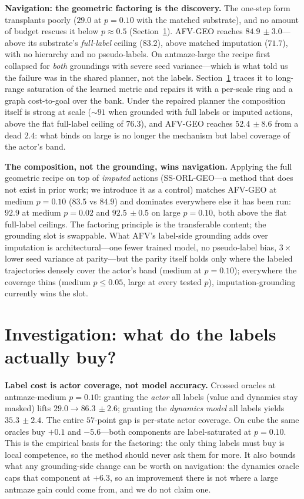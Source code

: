 \documentclass{article}
\newcommand{\pmm}[2]{#1{\scriptstyle\,\pm #2}}
\theoremstyle{plain}
\theoremstyle{definition}
\begin{document}
\textbf{Navigation: the geometric factoring is the discovery.} The one-step form transplants poorly ($29.0$ at $p{=}0.10$ with the matched substrate), and no amount of budget rescues it below $p{\approx}0.5$ (Section~\ref{sec:invest}). AFV-GEO reaches $\pmm{84.9}{3.0}$---above its substrate's \emph{full-label} ceiling ($83.2$), above matched imputation ($71.7$), with no hierarchy and no pseudo-labels. On antmaze-large the recipe first collapsed for \emph{both} groundings with severe seed variance---which is what told us the failure was in the shared planner, not the labels. Section~\ref{sec:invest} traces it to long-range saturation of the learned metric and repairs it with a per-scale ring and a graph cost-to-goal over the bank. Under the repaired planner the composition itself is strong at scale (${\sim}91$ when grounded with full labels or imputed actions, above the flat full-label ceiling of $76.3$), and AFV-GEO reaches $\pmm{52.4}{8.6}$ from a dead $2.4$: what binds on large is no longer the mechanism but label coverage of the actor's band.

\textbf{The composition, not the grounding, wins navigation.} Applying the full geometric recipe on top of \emph{imputed} actions (SS-ORL-GEO---a method that does not exist in prior work; we introduce it as a control) matches AFV-GEO at medium $p{=}0.10$ ($83.5$ vs $84.9$) and dominates everywhere else it has been run: $92.9$ at medium $p{=}0.02$ and $\pmm{92.5}{0.5}$ on large $p{=}0.10$, both above the flat full-label ceilings. The factoring principle is the transferable content; the grounding slot is swappable. What AFV's label-side grounding adds over imputation is architectural---one fewer trained model, no pseudo-label bias, $3\times$ lower seed variance at parity---but the parity itself holds only where the labeled trajectories densely cover the actor's band (medium at $p{=}0.10$); everywhere the coverage thins (medium $p{\le}0.05$, large at every tested $p$), imputation-grounding currently wins the slot.

\section{Investigation: what do the labels actually buy?}
\label{sec:invest}
\textbf{Label cost is actor coverage, not model accuracy.} Crossed oracles at antmaze-medium $p{=}0.10$: granting the \emph{actor} all labels (value and dynamics stay masked) lifts $29.0\rightarrow\pmm{86.3}{2.6}$; granting the \emph{dynamics model} all labels yields $\pmm{35.3}{2.4}$. The entire $57$-point gap is per-state actor coverage. On cube the same oracles buy ${+}0.1$ and ${-}5.6$---both components are label-saturated at $p{=}0.10$. This is the empirical basis for the factoring: the only thing labels must buy is local competence, so the method should never ask them for more. It also bounds what any grounding-side change can be worth on navigation: the dynamics oracle caps that component at ${+}6.3$, so an improvement there is not where a large antmaze gain could come from, and we do not claim one.
\end{document}
